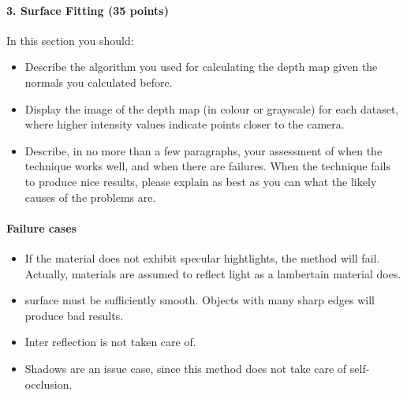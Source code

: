 \documentclass{paper}
\begin{document}
\paragraph{3. Surface Fitting (35 points)}

In this section you should:

\begin{itemize}
\item Describe the algorithm you used for calculating the depth map given the normals you calculated before.
\item Display the image of the depth map (in colour or grayscale) for each dataset, where higher intensity values indicate points closer to the camera.
\item Describe, in no more than a few paragraphs, your assessment of when the technique works well, and when there are failures. When the technique fails to produce nice results, please explain as best as you can what the likely causes of the problems are.
\end{itemize}

\paragraph{Failure cases}
\begin{itemize}
    \item If the material does not exhibit specular hightlights, the method will fail. Actually, materials are assumed to reflect light as a lambertain material does.
    \item surface must be sufficiently smooth. Objects with many sharp edges will produce bad results.
    \item Inter reflection is not taken care of.
    \item Shadows are an issue case, since this method does not take care of self-occlusion.
\end{itemize}
\end{document}
